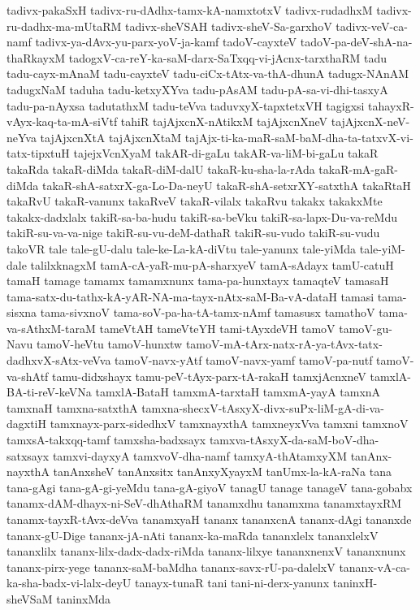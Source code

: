 {tadivx-pakaSxH
tadivx-ru-dAdhx-tamx-kA-namxtotxV
tadivx-rudadhxM
tadivx-ru-dadhx-ma-mUtaRM
tadivx-sheVSAH
tadivx-sheV-Sa-garxhoV
tadivx-veV-ca-namf
tadivx-ya-dAvx-yu-parx-yoV-ja-kamf
tadoV-cayxteV
tadoV-pa-deV-shA-na-thaRkayxM
tadogxV-ca-reY-ka-saM-darx-SaTxqq-vi-jAcnx-tarxthaRM
tadu
tadu-cayx-mAnaM
tadu-cayxteV
tadu-ciCx-tAtx-va-thA-dhunA
tadugx-NAnAM
tadugxNaM
taduha
tadu-ketxyXYva
tadu-pAsAM
tadu-pA-sa-vi-dhi-tasxyA
tadu-pa-nAyxsa
tadutathxM
tadu-teVva
taduvxyX-tapxtetxVH
tagigxsi
tahayxR-vAyx-kaq-ta-mA-siVtf
tahiR
tajAjxcnX-nAtikxM
tajAjxcnXneV
tajAjxcnX-neV-neYva
tajAjxcnXtA
tajAjxcnXtaM
tajAjx-ti-ka-maR-saM-baM-dha-ta-tatxvX-vi-tatx-tipxtuH
tajejxVcnXyaM
takAR-di-gaLu
takAR-va-liM-bi-gaLu
takaR
takaRda
takaR-diMda
takaR-diM-dalU
takaR-ku-sha-la-rAda
takaR-mA-gaR-diMda
takaR-shA-satxrX-ga-Lo-Da-neyU
takaR-shA-setxrXY-satxthA
takaRtaH
takaRvU
takaR-vanunx
takaRveV
takaR-vilalx
takaRvu
takakx
takakxMte
takakx-dadxlalx
takiR-sa-ba-hudu
takiR-sa-beVku
takiR-sa-lapx-Du-va-reMdu
takiR-su-va-va-nige
takiR-su-vu-deM-dathaR
takiR-su-vudo
takiR-su-vudu
takoVR
tale
tale-gU-dalu
tale-ke-La-kA-diVtu
tale-yanunx
tale-yiMda
tale-yiM-dale
talilxknagxM
tamA-cA-yaR-mu-pA-sharxyeV
tamA-sAdayx
tamU-catuH
tamaH
tamage
tamamx
tamamxnunx
tama-pa-hunxtayx
tamaqteV
tamasaH
tama-satx-du-tathx-kA-yAR-NA-ma-tayx-nAtx-saM-Ba-vA-dataH
tamasi
tama-sisxna
tama-sivxnoV
tama-soV-pa-ha-tA-tamx-nAmf
tamasusx
tamathoV
tama-va-sAthxM-taraM
tameVtAH
tameVteYH
tami-tAyxdeVH
tamoV
tamoV-gu-Navu
tamoV-heVtu
tamoV-hunxtw
tamoV-mA-tArx-natx-rA-ya-tAvx-tatx-dadhxvX-sAtx-veVva
tamoV-navx-yAtf
tamoV-navx-yamf
tamoV-pa-nutf
tamoV-va-shAtf
tamu-didxshayx
tamu-peV-tAyx-parx-tA-rakaH
tamxjAcnxneV
tamxlA-BA-ti-reV-keVNa
tamxlA-BataH
tamxmA-tarxtaH
tamxmA-yayA
tamxnA
tamxnaH
tamxna-satxthA
tamxna-shecxV-tAsxyX-divx-suPx-liM-gA-di-va-dagxtiH
tamxnayx-parx-sidedhxV
tamxnayxthA
tamxneyxVva
tamxni
tamxnoV
tamxsA-takxqq-tamf
tamxsha-badxsayx
tamxva-tAsxyX-da-saM-boV-dha-satxsayx
tamxvi-dayxyA
tamxvoV-dha-namf
tamxyA-thAtamxyXM
tanAnx-nayxthA
tanAnxsheV
tanAnxsitx
tanAnxyXyayxM
tanUmx-la-kA-raNa
tana
tana-gAgi
tana-gA-gi-yeMdu
tana-gA-giyoV
tanagU
tanage
tanageV
tana-gobabx
tanamx-dAM-dhayx-ni-SeV-dhAthaRM
tanamxdhu
tanamxma
tanamxtayxRM
tanamx-tayxR-tAvx-deVva
tanamxyaH
tananx
tananxcnA
tananx-dAgi
tananxde
tananx-gU-Dige
tananx-jA-nAti
tananx-ka-maRda
tananxlelx
tananxlelxV
tananxlilx
tananx-lilx-dadx-dadx-riMda
tananx-lilxye
tananxnenxV
tananxnunx
tananx-pirx-yege
tananx-saM-baMdha
tananx-savx-rU-pa-dalelxV
tananx-vA-ca-ka-sha-badx-vi-lalx-deyU
tanayx-tunaR
tani
tani-ni-derx-yanunx
taninxH-sheVSaM
taninxMda
}
